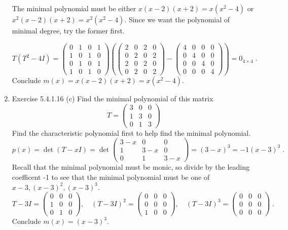 \documentclass[a4paper]{article}
\begin{document}
\begin{enumerate}
The minimal polynomial must be either $x(x-2)(x+2) = x(x^2-4)$ or $x^2(x-2)(x+2) = x^2(x^2-4)$. Since we want the polynomial of minimal degree, try the former first.

$$
T(T^2 - 4I) = 
\begin{pmatrix}
0 & 1 & 0 & 1\\
1 & 0 & 1 & 0\\
0 & 1 & 0 & 1\\
1 & 0 & 1 & 0
\end{pmatrix}
\left(
\begin{pmatrix}
2 & 0 & 2 & 0\\
0 & 2 & 0 & 2\\
2 & 0 & 2 & 0\\
0 & 2 & 0 & 2
\end{pmatrix}
- \begin{pmatrix}
4 & 0 & 0 & 0\\
0 & 4 & 0 & 0\\
0 & 0 & 4 & 0\\
0 & 0 & 0 & 4
\end{pmatrix}
\right)
= 0_{4\times 4} \;.
$$
Conclude $m(x) = x(x-2)(x+2) = x(x^2 - 4)$. 

\item{Exercise 5.4.1.16 (c)} Find the minimal polynomial of this matrix
$$T =
\begin{pmatrix}
3 & 0 & 0 \\
1 & 3 & 0 \\
0 & 1 & 3
\end{pmatrix}
$$
Find the characteristic polynomial first to help find the minimal polynomial.
$$
p(x) = \det(T - xI) = \det \begin{pmatrix}
3-x & 0 & 0 \\ 1 & 3-x & 0 \\ 0 & 1 & 3-x
\end{pmatrix} = (3-x)^3 = -1(x-3)^3 \;.
$$
Recall that the minimal polynomial must be monic, so divide by the leading coefficent -1 to see that the minimal polynomial must be one of $x-3, (x-3)^2, (x-3)^3$.
$$
T-3I = 
\begin{pmatrix} 0&0&0 \\ 1&0&0 \\ 0&1&0\end{pmatrix}, \quad 
(T-3I)^2 = 
\begin{pmatrix} 0&0&0 \\ 0&0&0 \\ 1&0&0 \end{pmatrix}, \quad
(T-3I)^3 = 
\begin{pmatrix} 0&0&0 \\ 0&0&0 \\ 0&0&0 \end{pmatrix} \;.
$$
Conclude $m(x) = (x-3)^3$. 


\end{enumerate}
\end{document}

